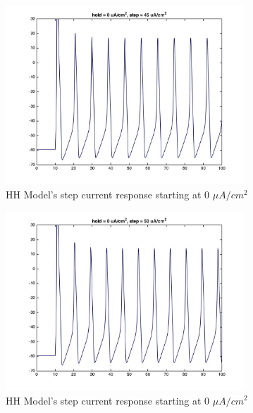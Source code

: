 \documentclass{beamer}
\begin{document}
\begin{frame}
  \begin{figure}
    \centering
    \includegraphics[width = 0.8\textwidth]{./images/current_0_45.jpg}
    \caption{HH Model's step current response starting at 0 $\mu A/cm^2$}
  \end{figure}
\end{frame}


\begin{frame}
  \begin{figure}
    \centering
    \includegraphics[width = 0.8\textwidth]{./images/current_0_50.jpg}
    \caption{HH Model's step current response starting at 0 $\mu A/cm^2$}
  \end{figure}
\end{frame}
\end{document}
